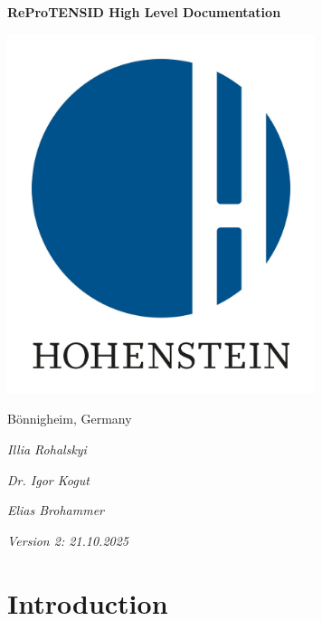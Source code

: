 \documentclass{report}
\begin{document}
\begin{titlepage}
    \centerline{\Huge\textbf{ReProTENSID High Level Documentation}}
    
    \vspace*{1cm}
    
    \centerline{\includegraphics[width=9cm]{hohenstein logo.jpg}}
    
    \vspace*{1.5cm}
    
    \centerline{\LARGE Bönnigheim, Germany}
    
    \vspace*{1cm}
    
    \centerline{\Large\textit{Illia Rohalskyi}}

    \vspace*{0.2cm}
    
    \centerline{\Large\textit{Dr. Igor Kogut}}

    \vspace*{0.2cm}
    
    \centerline{\Large\textit{Elias Brohammer}}
    
    \vspace*{1cm}
    
    \centerline{\Large\textit{Version 2: 21.10.2025}}
    
\end{titlepage}


\tableofcontents
\chapter{Introduction}
\end{document}
